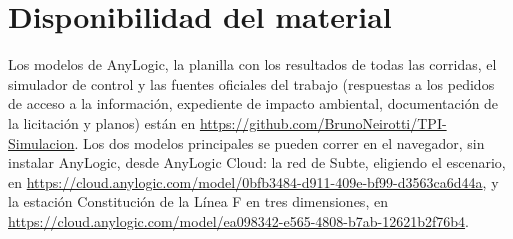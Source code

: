 \documentclass{article}
\newcommand{\enlaceRepositorio}{\url{https://github.com/BrunoNeirotti/TPI-Simulacion}}
\newcommand{\enlaceCloudRed}{\url{https://cloud.anylogic.com/model/0bfb3484-d911-409e-bf99-d3563ca6d44a}}
\newcommand{\enlaceCloudEstacion}{\url{https://cloud.anylogic.com/model/ea098342-e565-4808-b7ab-12621b2f76b4}}
\begin{document}
\section*{Disponibilidad del material}
\label{sec:material}

Los modelos de AnyLogic, la planilla con los resultados de todas las corridas, el simulador de control y las
fuentes oficiales del trabajo (respuestas a los pedidos de acceso a la información, expediente de impacto
ambiental, documentación de la licitación y planos) están en \enlaceRepositorio. Los dos modelos principales
se pueden correr en el navegador, sin instalar AnyLogic, desde AnyLogic Cloud: la red de Subte, eligiendo el
escenario, en \enlaceCloudRed, y la estación Constitución de la Línea F en tres dimensiones, en
\enlaceCloudEstacion.

\end{document}
